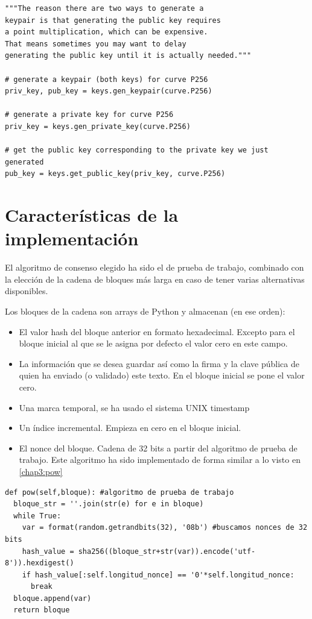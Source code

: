 \begin{itemize}
\begin{lstlisting}[frame=single]
"""The reason there are two ways to generate a 
keypair is that generating the public key requires
a point multiplication, which can be expensive. 
That means sometimes you may want to delay
generating the public key until it is actually needed."""

# generate a keypair (both keys) for curve P256
priv_key, pub_key = keys.gen_keypair(curve.P256)

# generate a private key for curve P256
priv_key = keys.gen_private_key(curve.P256)

# get the public key corresponding to the private key we just generated
pub_key = keys.get_public_key(priv_key, curve.P256)
\end{lstlisting}

\end{itemize}


\section{Características de la implementación}
El algoritmo de consenso elegido ha sido el de prueba de trabajo, combinado con la elección de la cadena de bloques más larga en caso de tener varias alternativas disponibles.

Los bloques de la cadena son arrays de Python y almacenan (en ese orden):
\begin{itemize}
\item El valor hash del bloque anterior en formato hexadecimal. Excepto para el bloque inicial al que se le asigna por defecto el valor cero en este campo.
\item La información que se desea guardar así como la firma y la clave pública de quien ha enviado (o validado) este texto. En el bloque inicial se pone el valor cero.
\item Una marca temporal, se ha usado el sistema UNIX timestamp
\item Un índice incremental. Empieza en cero en el bloque inicial.  
\item El nonce del bloque. Cadena de 32 bits a partir del algoritmo de prueba de trabajo. Este algoritmo ha sido implementado de forma similar a lo visto en \ref{chap3:pow}
\end{itemize}

\lstset{language=Python}
\lstset{frame=lines}
\lstset{basicstyle=\footnotesize}
\begin{lstlisting}[frame=single]
def pow(self,bloque): #algoritmo de prueba de trabajo
  bloque_str = ''.join(str(e) for e in bloque)
  while True:
    var = format(random.getrandbits(32), '08b') #buscamos nonces de 32 bits
    hash_value = sha256((bloque_str+str(var)).encode('utf-8')).hexdigest()
    if hash_value[:self.longitud_nonce] == '0'*self.longitud_nonce:
      break
  bloque.append(var)
  return bloque
\end{lstlisting}


